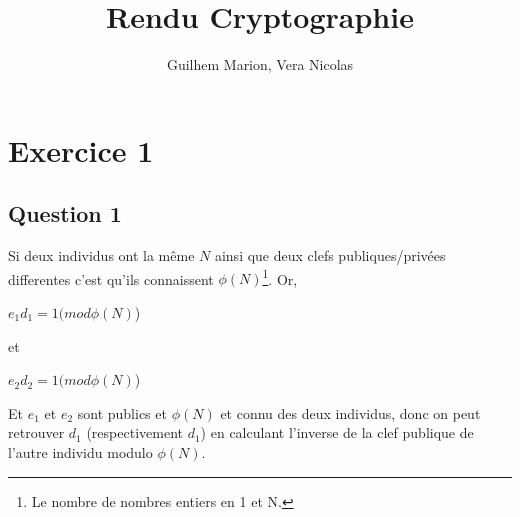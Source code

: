 \documentclass[10pt]{article}
\title{Rendu Cryptographie}
\author{Guilhem Marion, Vera Nicolas}
\date{}                                           %
\begin{document}
\maketitle


\section*{Exercice 1}

\subsection*{Question 1}

Si deux individus ont la même $N$ ainsi que deux clefs publiques/privées differentes c'est qu'ils connaissent $\phi(N)$\footnote{Le nombre de nombres entiers en 1 et N.}. Or, 

\begin{center}

$e_1d_1 = 1  (mod \phi(N)$)

\end{center}

et 

\begin{center}

$e_2d_2 = 1   (mod \phi(N)$)

\end{center}

Et $e_1$ et $e_2$ sont publics et $\phi(N)$ et connu des deux individus, donc on peut retrouver $d_1$ (respectivement $d_1$) en calculant l'inverse de la clef publique de l'autre individu modulo $\phi(N)$.
\end{document}
